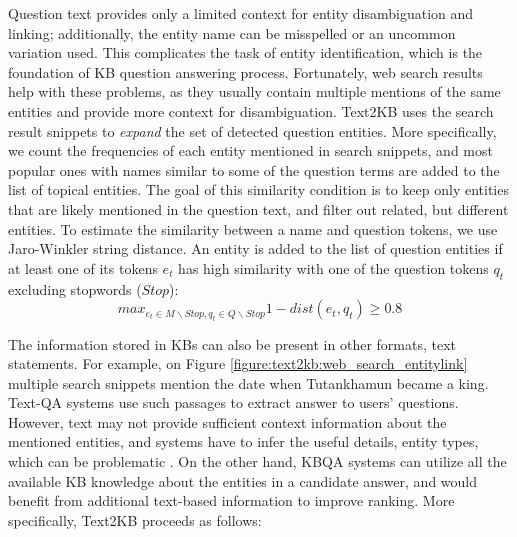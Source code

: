 Question text provides only a limited context for entity disambiguation and linking; additionally, the entity name can be misspelled or an uncommon variation used.
This complicates the task of entity identification, which is the foundation of KB question answering process.
Fortunately, web search results help with these problems, as they usually contain multiple mentions of the same entities and provide more context for disambiguation.
Text2KB uses the search result snippets to \textit{expand} the set of detected question entities.
More specifically, we count the frequencies of each entity mentioned in search snippets, and most popular ones with names similar to some of the question terms are added to the list of topical entities.
The goal of this similarity condition is to keep only entities that are likely mentioned in the question text, and filter out related, but different entities.
To estimate the similarity between a name and question tokens, we use Jaro-Winkler string distance.
An entity is added to the list of question entities if at least one of its tokens $e_t$ has high similarity with one of the question tokens $q_t$ excluding stopwords ($Stop$):
$$max_{e_t \in M \backslash Stop, q_t \in Q \backslash Stop} 1 - dist(e_t, q_t) \geq 0.8$$

The information stored in KBs can also be present in other formats, \eg text statements.
For example, on Figure \ref{figure:text2kb:web_search_entitylink} multiple search snippets mention the date when Tutankhamun became a king.
Text-QA systems use such passages to extract answer to users' questions.
However, text may not provide sufficient context information about the mentioned entities, and systems have to infer the useful details, \eg entity types, which can be problematic \cite{yih2014semantic}.
On the other hand, KBQA systems can utilize all the available KB knowledge about the entities in a candidate answer, and would benefit from additional text-based information to improve ranking.
More specifically, Text2KB proceeds as follows:

